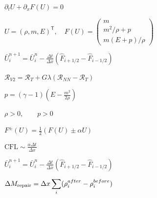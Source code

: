 \documentclass{article}
\begin{document}
\begin{preview}
\hbox{
\color[HTML]{242424}\fontsize{32}{38.4}\selectfont
$\displaystyle \partial_t U+\partial_xF(U)=0$
}
\end{preview}
\begin{preview}
\hbox{
\color[HTML]{242424}\fontsize{25}{30.0}\selectfont
$\displaystyle U=(\rho,m,E)^{\mathsf T},\quad F(U)=\begin{pmatrix}m\\m^2/\rho+p\\m(E+p)/\rho\end{pmatrix}$
}
\end{preview}
\begin{preview}
\hbox{
\color[HTML]{242424}\fontsize{24}{28.799999999999997}\selectfont
$\displaystyle \bar U_i^{n+1}=\bar U_i^n-\frac{\Delta t}{\Delta x}\left(\widehat F_{i+1/2}-\widehat F_{i-1/2}\right)$
}
\end{preview}
\begin{preview}
\hbox{
\color[HTML]{242424}\fontsize{29}{34.8}\selectfont
$\displaystyle \mathcal R_{V2}=\mathcal R_T+G\lambda\left(\mathcal R_{NN}-\mathcal R_T\right)$
}
\end{preview}
\begin{preview}
\hbox{
\color[HTML]{242424}\fontsize{32}{38.4}\selectfont
$\displaystyle p=(\gamma-1)\left(E-\frac{m^2}{2\rho}\right)$
}
\end{preview}
\begin{preview}
\hbox{
\color[HTML]{242424}\fontsize{29}{34.8}\selectfont
$\displaystyle \rho>0,\qquad p>0$
}
\end{preview}
\begin{preview}
\hbox{
\color[HTML]{242424}\fontsize{25}{30.0}\selectfont
$\displaystyle F^\pm(U)=\frac12\left(F(U)\pm\alpha U\right)$
}
\end{preview}
\begin{preview}
\hbox{
\color[HTML]{242424}\fontsize{26}{31.2}\selectfont
$\displaystyle \mathrm{CFL}\sim\frac{\alpha\Delta t}{\Delta x}$
}
\end{preview}
\begin{preview}
\hbox{
\color[HTML]{242424}\fontsize{25}{30.0}\selectfont
$\displaystyle \bar U_i^{n+1}=\bar U_i^n-\frac{\Delta t}{\Delta x}\left(\widehat F_{i+1/2}-\widehat F_{i-1/2}\right)$
}
\end{preview}
\begin{preview}
\hbox{
\color[HTML]{242424}\fontsize{21}{25.2}\selectfont
$\displaystyle \Delta M_{\rm repair}=\Delta x\sum_i(\rho_i^{after}-\rho_i^{before})$
}
\end{preview}
\end{document}

